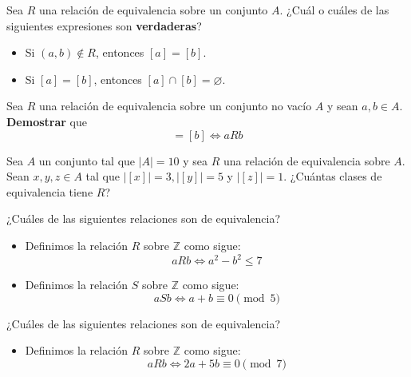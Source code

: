 \documentclass[oneside]{style}
\begin{document}
\begin{questions}[label=\protect\circled{\bfseries\arabic*}]
    \question
    {
        Sea $R$ una relación de equivalencia sobre un conjunto $A$. ¿Cuál o 
        cuáles de las siguientes expresiones son \textbf{verdaderas}?
        \begin{itemize}
            \item Si $(a,b) \not \in R$, entonces $[a] = [b]$.
            \item Si $[a] = [b]$, entonces $[a] \cap [b] = \varnothing$.
        \end{itemize}
    }

    \question
    {
        Sea $R$ una relación de equivalencia sobre un conjunto no vacío $A$ y 
        sean $a,b \in A$. \textbf{Demostrar} que 
        \begin{equation*}
            [a] = [b] \Leftrightarrow aRb
        \end{equation*}       
    }

    \question
    {
        Sea $A$ un conjunto tal que $|A| = 10$ y sea $R$ una relación de 
        equivalencia sobre $A$. Sean $x,y,z \in A$ tal que $|[x]| = 3, 
        |[y]| = 5$ y $|[z]| = 1$. ¿Cuántas clases de equivalencia tiene 
        $R$?
    }

    \question
    {
        ¿Cuáles de las siguientes relaciones son de equivalencia?
        \begin{itemize}
            \item Definimos la relación $R$ sobre $\mathbb{Z}$ como sigue:
            \begin{equation*}
                aRb \Leftrightarrow a^2 - b^2 \leq 7
            \end{equation*}

            \item Definimos la relación $S$ sobre $\mathbb{Z}$ como 
            sigue:
            \begin{equation*}
                aSb \Leftrightarrow a + b \equiv 0 \pmod{5}
            \end{equation*}
        \end{itemize}
    }

    \question
    {
        ¿Cuáles de las siguientes relaciones son de equivalencia?
        \begin{itemize}
            \item Definimos la relación $R$ sobre $\mathbb{Z}$ como 
            sigue:
            \begin{equation*}
                aRb \Leftrightarrow 2a + 5b \equiv 0 \pmod{7}
            \end{equation*}


\end{itemize}}
\end{questions}
\end{document}
